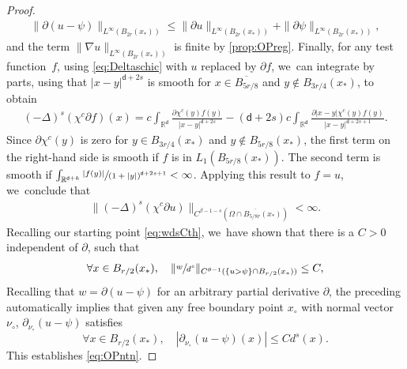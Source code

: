 \documentclass[10pt]{amsart}
\theoremstyle{plain}
\theoremstyle{definition}
\newcommand{\R}{{\mathbb{R}}}
\let\be\beta
\let\nab\nabla
\let\p\partial
\let\ol\overline
\let\k k
\renewcommand{\d}{\mathsf{d}}
\begin{document}
\begin{proof}
\begin{align*}
\|\p(u-\psi)\|_{L^\infty(B_{2r}(x_*))} \le \|\p u\|_{L^\infty(B_{2r}(x_*))} + \|\p\psi\|_{L^\infty(B_{2r}(x_*))},
\end{align*}
and the term $\|\nab u\|_{L^\infty(B_{2r}(x_*))}$ is finite by \cref{prop:OPreg}. Finally, for any test function~$f$, using \eqref{eq:Deltaschic} with $u$ replaced by $\p f$, we~can integrate by parts, using that $|x-y|^{\d+2s}$ is smooth for $x \in \ol{B_{5r/8}}$ and $y\notin B_{3r/4}(x_*)$, to obtain
\begin{align*}
(-\Delta)^s(\chi^c \p f)(x) = c\int_{\R^\d}\frac{\p\chi^c(y)f(y)}{|x-y|^{\d+2s}} -(\d+2s) c\int_{\R^\d} \frac{\p|x-y| \chi^c(y)f(y)}{|x-y|^{\d+2s+1}}.
\end{align*}
Since $\p\chi^c(y)$ is zero for $y\in B_{3r/4}(x_*)$ and $y\notin B_{5r/8}(x_*)$, the first term on the right-hand side is smooth if $f$ is in $L_1(B_{5r/8}(x_*))$. The second term is smooth if $\int_{\R^{\d+\k}}\sfrac{|f(y)|}{(1+|y|)^{\d+2s+1}}<\infty$. Applying this result to {$f=u$}, we~conclude that
\begin{align*}
\|(-\Delta)^s(\chi^c\p {u})\|_{C^{\be-1-s}(\ol{\Omega\cap B_{5/8r}(x_*)})} <\infty.
\end{align*}
Recalling our starting point \eqref{eq:wdsCth}, we~have shown that there is a $C>0$ independent of $\p$, such that
\begin{equation}\label{eq:wdsCth'}
\forall x\in B_{r/2}(x_*), \quad \|\sfrac{w}{d^s}\|_{C^{\theta-1}(\{u>\psi\}\cap B_{r/2}(x_*))} \le C,
\end{equation}
{Recalling that $w=\p(u-\psi)$ for an arbitrary partial derivative $\p$,} the preceding automatically implies that given any free boundary point $x_\circ$ with normal vector $\nu_{\circ}$, $\p_{\nu_\circ}(u-\psi)$ satisfies
\begin{equation*}
\forall x\in B_{r/2}(x_*), \quad |\p_{\nu_{\circ}}(u-\psi)(x)|\le C d^s(x).
\end{equation*}
This establishes \eqref{eq:OPntn}.


\end{proof}
\end{document}
